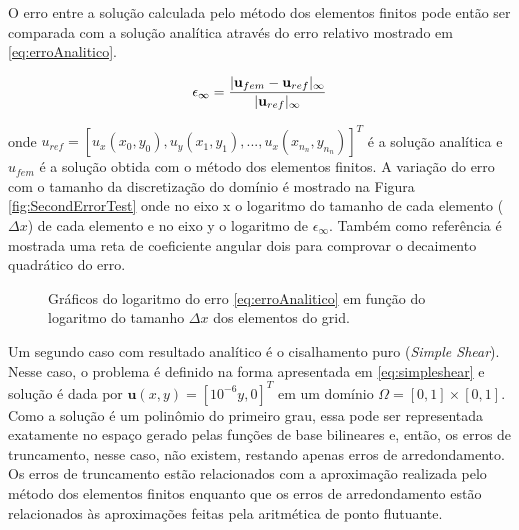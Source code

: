 O erro entre a solução calculada pelo método dos elementos finitos pode então ser comparada
com a solução analítica através do erro relativo mostrado em \eqref{eq:erroAnalitico}.

\begin{equation} \label{eq:erroAnalitico}
    \epsilon_{\infty} =\frac{|\mathbf{u}_{fem} - \mathbf{u}_{ref}|_{\infty}}{|\mathbf{u}_{ref}|_{\infty}}
\end{equation}


onde $u_{ref} = [u_x(x_0, y_0), u_y(x_1, y_1), ..., u_x(x_{n_n}, y_{n_n})]^T$ é a solução analítica e $u_{fem}$ é a solução obtida com o método dos elementos finitos. A variação do erro com o tamanho da discretização do domínio é mostrado na Figura  \ref{fig:SecondErrorTest} onde no eixo x o logaritmo do tamanho de cada elemento ($\Delta x$) de cada elemento e no eixo y o logaritmo de $\epsilon_{\infty}$. Também como referência é mostrada uma reta de coeficiente angular dois para comprovar o decaimento quadrático do erro.


\begin{figure}[h]
\center
{}
\qquad
{}
\caption{Gráficos do logaritmo do erro \eqref{eq:erroAnalitico} em função do logaritmo do tamanho $\Delta x$ dos elementos do grid.}
\end{figure}
    
    
Um segundo caso com resultado analítico é o cisalhamento puro (\textit{Simple Shear}). Nesse caso, o problema é definido na forma apresentada em \eqref{eq:simpleshear} e solução é dada por $\mathbf{u}(x,y) = [10^{-6}y, 0]^T$ em um domínio $\Omega = [0, 1] \times [0, 1]$. Como a solução é um polinômio do primeiro grau, essa pode ser representada exatamente no espaço gerado pelas funções de base bilineares e, então, os erros de truncamento, nesse caso, não existem, restando apenas  erros de arredondamento. Os erros de truncamento estão relacionados com a aproximação realizada pelo método dos elementos finitos enquanto que os erros de arredondamento estão relacionados às aproximações feitas pela aritmética de ponto flutuante.


